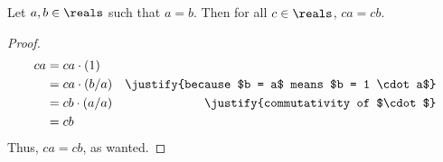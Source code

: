 \begin{theorem}
  Let $a, b \in \reals$ such that $a = b$. Then for all $c \in \reals$,
  $ca = cb$.
\end{theorem}

\begin{proof}
  \begin{align}
    ca &= ca \cdot (1)  \\
       &= ca \cdot (b / a) & \justify{because $b = a$ means $b = 1 \cdot a$} \\
       &= cb \cdot (a / a) & \justify{commutativity of $\cdot$} \\
       &= cb
  \end{align}
  Thus, $ca = cb$, as wanted.
\end{proof}

